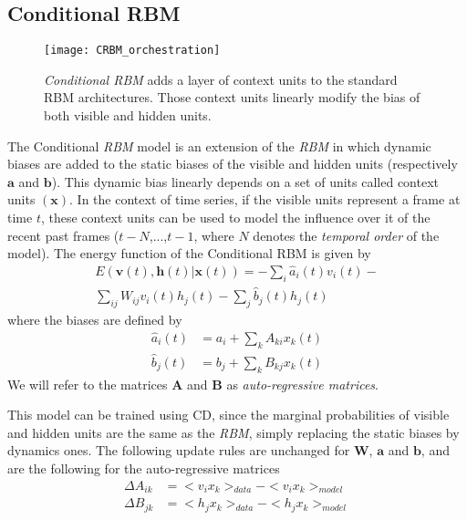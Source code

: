 \documentclass[letterpaper]{article}
\begin{document}
\subsection{Conditional RBM}
\begin{figure}
\centering
\texttt{[image: CRBM\_orchestration]}
\caption{\textit{Conditional RBM} adds a layer of context units to the standard RBM architectures. Those context units linearly modify the bias of both visible and hidden units.}
\end{figure}
The Conditional \textit{RBM} model \cite{taylor2009factored} is an extension of the \textit{RBM} in which dynamic biases are added to the static biases of the visible and hidden units (respectively $\bm{a}$ and $\bm{b}$). This dynamic bias linearly depends on a set of units called context units $(\bm{x})$. In the context of time series, if the visible units represent a frame at time $t$, these context units can be used to model the influence over it of the recent past frames ($t-N$,...,$t-1$, where $N$ denotes the \textit{temporal order} of the model).
The energy function of the Conditional RBM is given by
\begin{equation}
\begin{split}
\label{eq:energy_CRBM}
E(\bm{v}(t),\bm{h}(t)|\bm{x}(t)) =  - \sum_{i} \hat{a}_{i}(t)v_{i}(t) - \\ \sum_{ij}W_{ij}v_{i}(t)h_{j}(t) - \sum_{j} \hat{b}_{j}(t)h_{j}(t)
\end{split}
\end{equation}
where the biases are defined by 
\begin{align*}
\hat{a}_{i}(t) &= a_{i} + \sum_{k}A_{ki}x_{k}(t)\\
\hat{b}_{j}(t) &= b_{j} + \sum_{k}B_{kj}x_{k}(t)
\end{align*}
We will refer to the matrices $\bm{A}$ and $\bm{B}$ as \textit{auto-regressive matrices}.

This model can be trained using CD, since the marginal probabilities of visible and hidden units are the same as the \textit{RBM}, simply replacing the static biases by dynamics ones.
The following update rules are unchanged for $\bm{W}$, $\bm{a}$ and $\bm{b}$, and are the following for the auto-regressive matrices
\begin{align}
\Delta A_{ik} 	&=<v_{i}x_{k} >_{data} - <v_{i}x_{k} >_{model}\\
\Delta B_{jk} 	&= <h_{j}x_{k} >_{data} - <h_{j}x_{k} >_{model}\\
\end{align}
\end{document}
